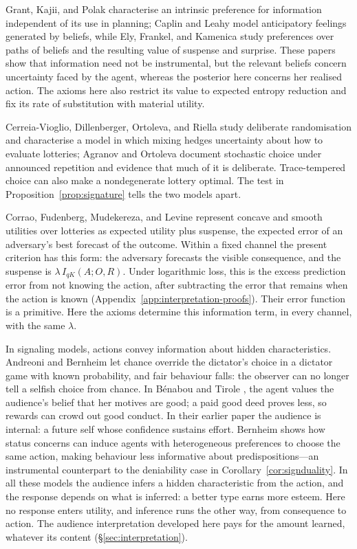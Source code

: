 \documentclass[11pt,a4paper]{article}
\theoremstyle{definition}
\newcommand{\I}{I}
\newcommand{\1}{\mathbf 1}
\begin{document}
Grant, Kajii, and Polak \cite{GrantKajiiPolak1998} characterise an intrinsic preference for information
independent of its use in planning; Caplin and Leahy \cite{CaplinLeahy2001} model anticipatory feelings generated
by beliefs, while Ely, Frankel, and Kamenica \cite{ElyFrankelKamenica2015} study preferences over paths of beliefs
and the resulting value of suspense and surprise.  These papers show that information need not be instrumental,
but the relevant beliefs concern uncertainty faced by the agent, whereas the posterior here concerns her
realised action.  The axioms here also restrict its value to expected entropy reduction and fix its rate of
substitution with material utility.

Cerreia-Vioglio, Dillenberger, Ortoleva, and Riella
\cite{CerreiaVioglioDillenbergerOrtolevaRiella2019} study deliberate randomisation and characterise a model in
which mixing hedges uncertainty about how to evaluate lotteries; Agranov and Ortoleva
\cite{AgranovOrtoleva2017} document stochastic choice under announced repetition and evidence that much of it is
deliberate.  Trace-tempered choice can also make a nondegenerate lottery optimal. The test in Proposition~\ref{prop:signature} tells the two models apart.

Corrao, Fudenberg, Mudekereza, and Levine \cite{CorraoFudenbergMudekerezaLevine2026} represent
concave and smooth utilities over lotteries as expected utility plus suspense, the expected error of an
adversary's best forecast of the outcome.  Within a fixed channel the present criterion has this form: the
adversary forecasts the visible consequence, and the suspense is $\lambda\,\I_{qK}(A;O,R)$. Under logarithmic loss, this is the excess prediction error from not knowing the action, after subtracting the error that remains when the action is known (Appendix~\ref{app:interpretation-proofs}). Their error function is a primitive. Here the axioms determine this information term, in every channel, with the same $\lambda$.

In signaling models, actions convey information about hidden characteristics.  Andreoni and Bernheim
\cite{AndreoniBernheim2009} let chance override the dictator's choice in a dictator game with known probability, and fair behaviour
falls: the observer can no longer tell a selfish choice from chance.  In B\'enabou and Tirole
\cite{BenabouTirole2006}, the agent values the audience's belief that her motives are good; a paid good deed
proves less, so rewards can crowd out good conduct.  In their earlier paper \cite{BenabouTirole2002} the
audience is internal: a future self whose confidence sustains effort.  Bernheim \cite{Bernheim1994} shows how
status concerns can induce agents with heterogeneous preferences to choose the same action, making behaviour less
informative about predispositions---an instrumental counterpart to the deniability case in
Corollary~\ref{cor:signduality}.  In all these models the audience infers a hidden characteristic from the
action, and the response depends on what is inferred: a better type earns more esteem.  Here no response enters
utility, and inference runs the other way, from consequence to action. The audience interpretation developed here pays for the amount learned, whatever its content (\S\ref{sec:interpretation}).
\end{document}
